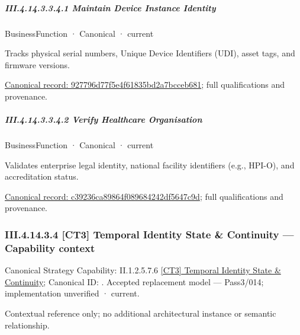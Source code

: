 \subparagraph*{III.4.14.3.3.4.1 Maintain Device Instance Identity}
\label{navigation:III.4.14.3.3.4.1}

\label{element:927796d77f5e4f61835bd2a7bcceb681}
{\small BusinessFunction · Canonical · current}\par

Tracks physical serial numbers, Unique Device Identifiers (UDI), asset tags, and firmware versions.


{\footnotesize \href{../../../../../../../../continuum/business/business-function/927796d77f5e4f61835bd2a7bcceb681.md}{Canonical record: 927796d77f5e4f61835bd2a7bcceb681}; full qualifications and provenance.}\par
\subparagraph*{III.4.14.3.3.4.2 Verify Healthcare Organisation}
\label{navigation:III.4.14.3.3.4.2}

\label{element:c39236ca89864f089684242df5647c9d}
{\small BusinessFunction · Canonical · current}\par

Validates enterprise legal identity, national facility identifiers (e.g., HPI-O), and accreditation status.


{\footnotesize \href{../../../../../../../../continuum/business/business-function/c39236ca89864f089684242df5647c9d.md}{Canonical record: c39236ca89864f089684242df5647c9d}; full qualifications and provenance.}\par
\subsubsection*{III.4.14.3.4 [CT3] Temporal Identity State \& Continuity — Capability context}
\label{navigation:III.4.14.3.4}

{\small Canonical Strategy Capability: II.1.2.5.7.6 \hyperref[element:dae537d7b2f94d1596036ba891cab10d]{[CT3] Temporal Identity State \& Continuity}; Canonical ID: \texttt{}. Accepted replacement model — Pass3/014; implementation unverified · current.}\par
Contextual reference only; no additional architectural instance or semantic relationship.\par
